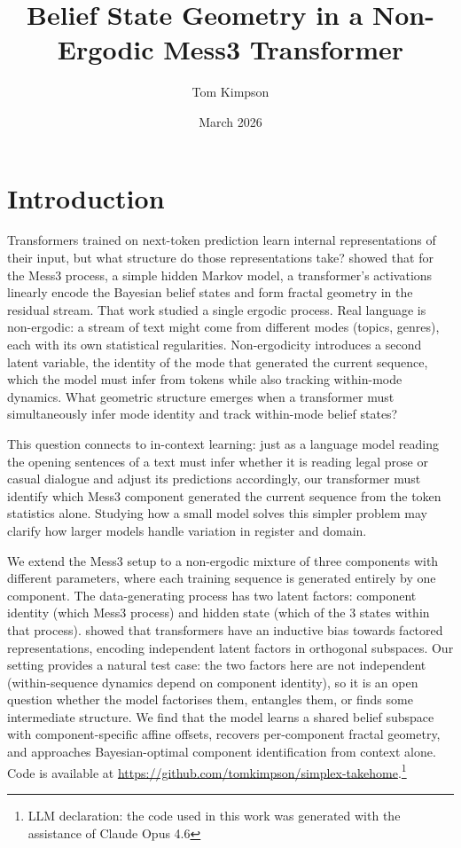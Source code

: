 \documentclass{article}
\title{Belief State Geometry in a Non-Ergodic Mess3 Transformer}
\date{March 2026}
\author{Tom Kimpson}
\begin{document}
\maketitle


\section{Introduction}

Transformers trained on next-token prediction learn internal representations of their input, but what structure do those representations take? \citet{shai2024} showed that for the Mess3 process, a simple hidden Markov model, a transformer's activations linearly encode the Bayesian belief states and form fractal geometry in the residual stream. That work studied a single ergodic process. Real language is non-ergodic: a stream of text might come from different modes (topics, genres), each with its own statistical regularities. Non-ergodicity introduces a second latent variable, the identity of the mode that generated the current sequence, which the model must infer from tokens while also tracking within-mode dynamics. What geometric structure emerges when a transformer must simultaneously infer mode identity and track within-mode belief states?

This question connects to in-context learning: just as a language model reading the opening sentences of a text must infer whether it is reading legal prose or casual dialogue and adjust its predictions accordingly, our transformer must identify which Mess3 component generated the current sequence from the token statistics alone. Studying how a small model solves this simpler problem may clarify how larger models handle variation in register and domain.

We extend the Mess3 setup to a non-ergodic mixture of three components with different parameters, where each training sequence is generated entirely by one component. The data-generating process has two latent factors: component identity (which Mess3 process) and hidden state (which of the 3 states within that process). \citet{shai2026} showed that transformers have an inductive bias towards factored representations, encoding independent latent factors in orthogonal subspaces. Our setting provides a natural test case: the two factors here are not independent (within-sequence dynamics depend on component identity), so it is an open question whether the model factorises them, entangles them, or finds some intermediate structure. We find that the model learns a shared belief subspace with component-specific affine offsets, recovers per-component fractal geometry, and approaches Bayesian-optimal component identification from context alone. Code is available at \url{https://github.com/tomkimpson/simplex-takehome}.\footnote{LLM declaration: the code used in this work was generated with the assistance of Claude Opus 4.6}
\end{document}
